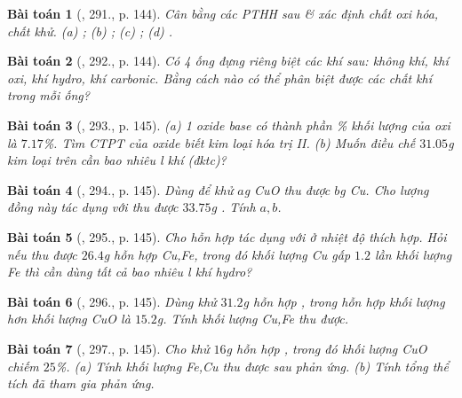 \documentclass{article}
\newtheorem{baitoan}{Bài toán}
\begin{document}
\begin{baitoan}[\cite{An_400_BT_Hoa_Hoc_8_2020}, 291., p. 144]
	Cân bằng các PTHH sau \& xác định chất oxi hóa, chất khử. (a) \emph{}; (b) \emph{}; (c) \emph{}; (d) \emph{}.
\end{baitoan}

\begin{baitoan}[\cite{An_400_BT_Hoa_Hoc_8_2020}, 292., p. 144]
	Có 4 ống đựng riêng biệt các khí sau: không khí, khí oxi, khí hydro, khí carbonic. Bằng cách nào có thể phân biệt được các chất khí trong mỗi ống?
\end{baitoan}

\begin{baitoan}[\cite{An_400_BT_Hoa_Hoc_8_2020}, 293., p. 145]
	(a) 1 oxide base có thành phần \% khối lượng của oxi là $7.17$\%. Tìm CTPT của oxide biết kim loại hóa trị II. (b) Muốn điều chế $31.05$\emph{g} kim loại trên cần bao nhiêu \emph{l} khí \emph{} (đktc)?
\end{baitoan}

\begin{baitoan}[\cite{An_400_BT_Hoa_Hoc_8_2020}, 294., p. 145]
	Dùng \emph{} để khử $a$\emph{g} \emph{CuO} thu được $b$\emph{g} \emph{Cu}. Cho lượng đồng này tác dụng với \emph{} thu được $33.75$\emph{g} \emph{}. Tính $a,b$.
\end{baitoan}

\begin{baitoan}[\cite{An_400_BT_Hoa_Hoc_8_2020}, 295., p. 145]
	Cho hỗn hợp \emph{} tác dụng với \emph{} ở nhiệt độ thích hợp. Hỏi nếu thu được $26.4$\emph{g} hỗn hợp \emph{Cu,Fe}, trong đó khối lượng \emph{Cu} gấp $1.2$ lần khối lượng \emph{Fe} thì cần dùng tất cả bao nhiêu \emph{l} khí hydro?
\end{baitoan}

\begin{baitoan}[\cite{An_400_BT_Hoa_Hoc_8_2020}, 296., p. 145]
	Dùng \emph{} khử $31.2$\emph{g} hỗn hợp \emph{}, trong hỗn hợp khối lượng \emph{} hơn khối lượng \emph{CuO} là $15.2$\emph{g}. Tính khối lượng \emph{Cu,Fe} thu được.
\end{baitoan}

\begin{baitoan}[\cite{An_400_BT_Hoa_Hoc_8_2020}, 297., p. 145]
	Cho \emph{} khử $16$\emph{g} hỗn hợp \emph{}, trong đó khối lượng \emph{CuO} chiếm $25$\%. (a) Tính khối lượng \emph{Fe,Cu} thu được sau phản ứng. (b) Tính tổng thể tích \emph{} đã tham gia phản ứng.
\end{baitoan}
\end{document}

